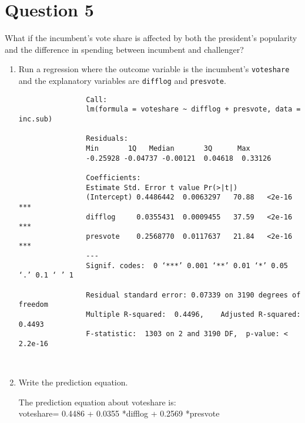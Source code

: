 \documentclass[12pt,letterpaper]{article}
\begin{document}
\vspace{.5cm}

\section*{Question 5}
\noindent What if the incumbent's vote share is affected by both the president's popularity and the difference in spending between incumbent and challenger? 
	\begin{enumerate}
		\item Run a regression where the outcome variable is the incumbent's \texttt{voteshare} and the explanatory variables are \texttt{difflog} and \texttt{presvote}.
		
		\vspace{.15cm}
		 
		\vspace{.15cm}
		\begin{footnotesize}
			\begin{verbatim}
				Call:
				lm(formula = voteshare ~ difflog + presvote, data = inc.sub)
				
				Residuals:
				Min       1Q   Median       3Q      Max 
				-0.25928 -0.04737 -0.00121  0.04618  0.33126 
				
				Coefficients:
				Estimate Std. Error t value Pr(>|t|)    
				(Intercept) 0.4486442  0.0063297   70.88   <2e-16 ***
				difflog     0.0355431  0.0009455   37.59   <2e-16 ***
				presvote    0.2568770  0.0117637   21.84   <2e-16 ***
				---
				Signif. codes:  0 ‘***’ 0.001 ‘**’ 0.01 ‘*’ 0.05 ‘.’ 0.1 ‘ ’ 1
				
				Residual standard error: 0.07339 on 3190 degrees of freedom
				Multiple R-squared:  0.4496,	Adjusted R-squared:  0.4493 
				F-statistic:  1303 on 2 and 3190 DF,  p-value: < 2.2e-16
				
				
			\end{verbatim}
		\end{footnotesize}
		\item Write the prediction equation.	
		\vspace{.15cm}
		 
		\vspace{.15cm}
		The prediction equation about voteshare is:\\
		voteshare= 0.4486 + 0.0355 *difflog + 0.2569 *presvote\\
		

\end{enumerate}
\end{document}
